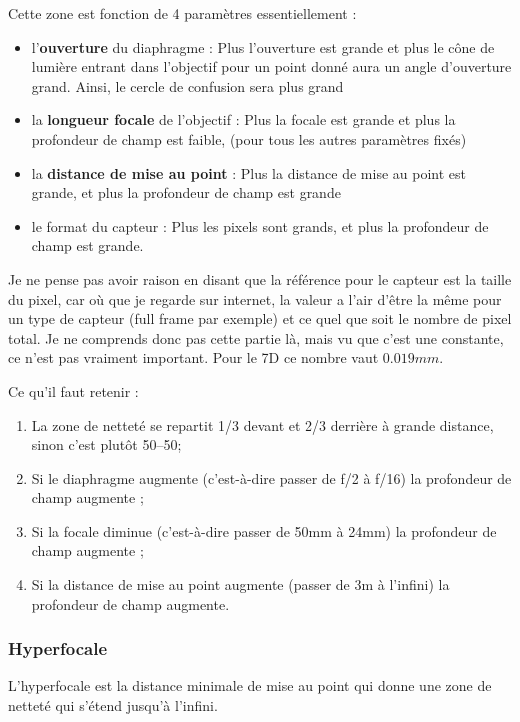 \documentclass[a4paper,twoside]{article}
\begin{document}
Cette zone est fonction de 4 paramètres essentiellement :
\begin{itemize}
\item l'\textbf{ouverture} du diaphragme : Plus l'ouverture est grande et plus le cône de lumière entrant dans l'objectif pour un point donné aura un angle d'ouverture grand. Ainsi, le cercle de confusion sera plus grand
\item la \textbf{longueur focale} de l'objectif : Plus la focale est grande et plus la profondeur de champ est faible, (pour tous les autres paramètres fixés)
\item la \textbf{distance de mise au point} : Plus la distance de mise au point est grande, et plus la profondeur de champ est grande
\item le format du capteur : Plus les pixels sont grands, et plus la profondeur de champ est grande.
\end{itemize}

\begin{attention}
Je ne pense pas avoir raison en disant que la référence pour le capteur est la taille du pixel, car où que je regarde sur internet, la valeur a l'air d'être la même pour un type de capteur (full frame par exemple) et ce quel que soit le nombre de pixel total. Je ne comprends donc pas cette partie là, mais vu que c'est une constante, ce n'est pas vraiment important. Pour le 7D ce nombre vaut $0.019\unit{mm}$.
\end{attention}

\begin{important}
Ce qu'il faut retenir : 
\begin{enumerate}
\item La zone de netteté se repartit 1/3 devant et 2/3 derrière à grande distance, sinon c'est plutôt 50--50;
\item Si le diaphragme augmente (c’est-à-dire passer de f/2 à f/16) la profondeur de champ augmente ;
\item Si la focale diminue (c’est-à-dire passer de 50mm à 24mm) la profondeur de champ augmente ;
\item Si la distance de mise au point augmente (passer de 3m à l’infini) la profondeur de champ augmente.
\end{enumerate}
\end{important}

\subsubsection{Hyperfocale}
L'hyperfocale est la distance minimale de mise au point qui donne une zone de netteté qui s'étend jusqu'à l'infini.
\end{document}
